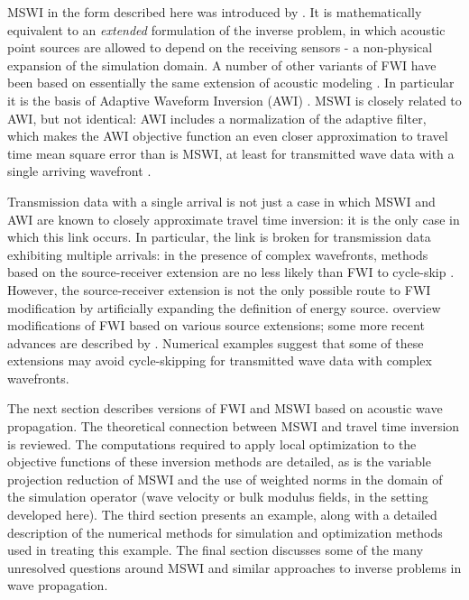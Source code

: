 MSWI in the form described here was introduced by
\cite{HuangSymes2015SEG,HuangSymes:Geo17}. It is mathematically
equivalent to an {\em extended} formulation of the inverse problem, in
which acoustic point sources are allowed to depend on the receiving
sensors - a non-physical expansion of the simulation domain. A number
of other variants of FWI have been based on essentially the same
extension of acoustic modeling
\cite[]{Song:94c,Symes:94c,Plessix:00,LuoSava:11,LiAlkhalifah:21}. In
particular it is the basis of Adaptive Waveform Inversion (AWI) \cite[]{Warner:16,
  GuaschWarnerRavaut:GEO19,Warneretal:SEG21, Guaschetal:NPJDM20}. MSWI
is closely related to AWI, but not identical: AWI includes a
normalization of the adaptive filter, which makes the AWI objective
function an even closer approximation to travel time mean square error
than is MSWI, at least for transmitted wave data with a single
arriving wavefront \cite[]{Symes:24a}.

Transmission data with a single arrival is not just a case in which
MSWI and AWI are known to closely approximate travel time inversion:
it is the only case in which this link occurs. In particular, the link
is broken for transmission data exhibiting multiple arrivals: in the
presence of complex wavefronts, methods based on the source-receiver
extension are no less likely than FWI to cycle-skip
\cite[]{Symes:94c,HuangSymes:Geo17,Symes:24a}. However, the
source-receiver extension is not the only possible route to FWI
modification by artificially expanding the definition of energy
source. \cite{HuangNammourSymesDollizal:SEG19} overview modifications
of FWI based on various source extensions; some more recent advances
are described by
\cite{MetivierBrossier:SEG20,PladysBrossierLiMetivier:GEO21,LiAlkhalifah:21,Yongetal:GJI23,Opertoetal:GEO23}.
Numerical examples suggest that some of these extensions may avoid
cycle-skipping for transmitted wave data with complex wavefronts.

The next section describes versions of FWI and MSWI based on
acoustic wave propagation. The theoretical connection between MSWI and
travel time inversion is reviewed. The computations required to apply local
optimization to the objective functions of these inversion methods are
detailed, as is the variable projection reduction of MSWI and the use
of weighted norms in the domain of the simulation operator (wave
velocity or bulk modulus fields, in the setting developed here). The
third section presents an example, along with a detailed description
of the numerical methods for simulation and optimization methods used
in treating this example. The final section discusses some of the many
unresolved questions around MSWI and similar approaches to inverse
problems in wave propagation.

